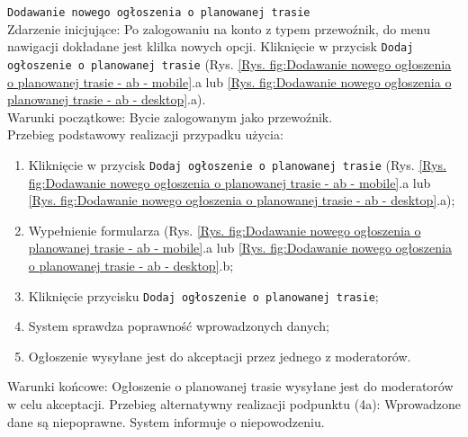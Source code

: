 \texttt{Dodawanie nowego ogłoszenia o planowanej trasie} \\
Zdarzenie inicjujące: Po zalogowaniu na konto z typem przewoźnik, do menu nawigacji dokładane jest klilka nowych opcji. Kliknięcie w przycisk \texttt{Dodaj ogłoszenie o planowanej trasie} (Rys. \ref{Rys. fig:Dodawanie nowego ogłoszenia o planowanej trasie - ab - mobile}.a lub \ref{Rys. fig:Dodawanie nowego ogłoszenia o planowanej trasie - ab - desktop}.a). \\
Warunki początkowe: Bycie zalogowanym jako przewoźnik. \\
Przebieg podstawowy realizacji przypadku użycia:
\begin{enumerate}
    \item Kliknięcie w przycisk \texttt{Dodaj ogłoszenie o planowanej trasie} (Rys. \ref{Rys. fig:Dodawanie nowego ogłoszenia o planowanej trasie - ab - mobile}.a lub \ref{Rys. fig:Dodawanie nowego ogłoszenia o planowanej trasie - ab - desktop}.a);
    \item Wypełnienie formularza (Rys. \ref{Rys. fig:Dodawanie nowego ogłoszenia o planowanej trasie - ab - mobile}.a lub \ref{Rys. fig:Dodawanie nowego ogłoszenia o planowanej trasie - ab - desktop}.b;
    \item Kliknięcie przycisku \texttt{Dodaj ogłoszenie o planowanej trasie};
    \item System sprawdza poprawność wprowadzonych danych;
    \item Ogłoszenie wysyłane jest do akceptacji przez jednego z moderatorów.
\end{enumerate}
Warunki końcowe: Ogłoszenie o planowanej trasie wysyłane jest do moderatorów w celu akceptacji.
Przebieg alternatywny realizacji podpunktu (4a): Wprowadzone dane są niepoprawne. System informuje o niepowodzeniu. \\

